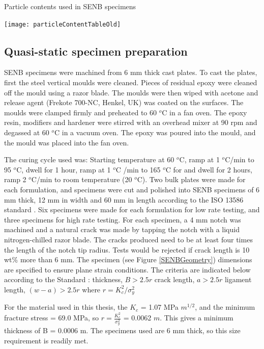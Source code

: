 \documentclass[numbers=noendperiod,chapterprefix=on]{icldt} %
\begin{document}
\begin{table}[!htpb]
\centering
\caption{Particle contents used in SENB specimens} \label{particleContentTableOld}
\texttt{[image: particleContentTableOld]}
\end{table}
\FloatBarrier
\subsection{Quasi-static specimen preparation}
SENB specimens were machined from 6 mm thick cast plates. To cast the plates, first the steel vertical moulds were cleaned. Pieces of residual epoxy were cleaned off the mould using a razor blade. The moulds were then wiped with acetone and release agent (Frekote 700-NC, Henkel, UK) was coated on the surfaces. The moulds were clamped firmly and preheated to 60 $^o$C in a fan oven. 
The epoxy resin, modifiers and hardener were stirred with an overhead mixer at 90 rpm and degassed at 60 $^o$C in a vacuum oven. The epoxy was poured into the mould, and the mould was placed into the fan oven.

The curing cycle used was: Starting temperature at 60 $^o$C, ramp at 1 $^o$C/min to 95 $^o$C, dwell for 1 hour, ramp at 1 $^o$C /min to 165 $^o$C for and dwell for 2 hours, ramp 2 $^o$C/min to room temperature (20 $^o$C).
Two bulk plates were made for each formulation, and specimens were cut and polished into SENB specimens of 6 mm thick, 12 mm in width and 60 mm in length according to the ISO 13586 standard \cite{ISO13586}. Six specimens were made for each formulation for low rate testing, and three specimens for high rate testing. 
For each specimen, a 4 mm notch was machined and a natural crack was made by tapping the notch with a liquid nitrogen-chilled razor blade. The cracks produced need to be at least four times the length of the notch tip radius. Tests would be rejected if crack length is 10 wt\% more than 6 mm.
The specimen (see Figure \ref{SENBGeometry}) dimensions are specified to ensure plane strain conditions. The criteria are indicated below according to the Standard \cite{ISO13586}:
\newline
thickness, $ B > 2.5 r$
\newline
crack length, $a > 2.5 r$
\newline
ligament length, $(w - a) > 2.5 r$
\newline
where $r = K_c^2/\sigma _{y}^2 $

For the material used in this thesis, the $ K_{c} $ =  1.07
MPa $ m^{1/2} $, and the minimum fracture stress =  69.0 MPa, so $ r = \frac{K_{c}^2}{\sigma_{y}^{2}} $ = 0.0062 $ m $. This gives a minimum thickness of B = 0.0006 m. The specimens used are 6 mm thick, so this size requirement is readily met. 
\end{document}
